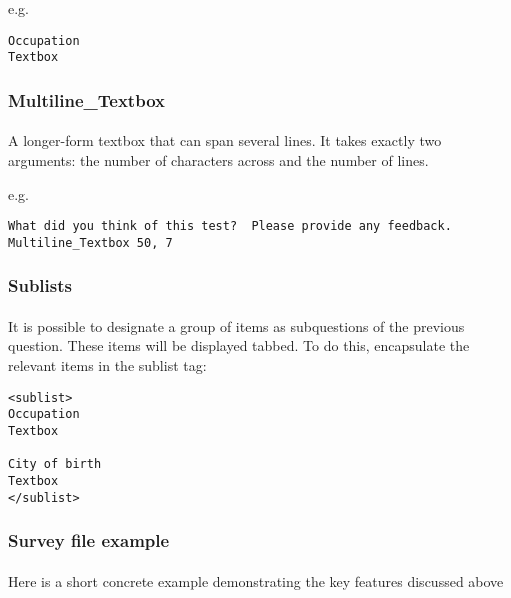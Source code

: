 e.g.

\begin{lstlisting}
Occupation
Textbox
\end{lstlisting}

\subsubsection{Multiline\_Textbox}

\paragraph{}
A longer-form textbox that can span several lines.  It takes exactly two arguments: the number of characters across and the number of lines.

e.g.

\begin{lstlisting}
What did you think of this test?  Please provide any feedback.
Multiline_Textbox 50, 7
\end{lstlisting}

\subsubsection{Sublists}

\paragraph{}
It is possible to designate a group of items as subquestions of the previous question.  These items will be displayed tabbed.  To do this, encapsulate the relevant items in the sublist tag:

\begin{lstlisting}
<sublist>
Occupation
Textbox

City of birth
Textbox
</sublist>
\end{lstlisting}

\subsubsection{Survey file example}

\paragraph{}
Here is a short concrete example demonstrating the key features discussed above

\paragraph{}

